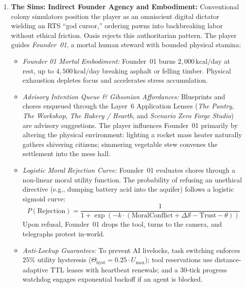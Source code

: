 \begin{enumerate}
    \item \textbf{The Sims: Indirect Founder Agency and Embodiment:} Conventional colony simulators position the player as an omniscient digital dictator wielding an RTS ``god cursor,'' ordering pawns into backbreaking labor without ethical friction. Oasis rejects this authoritarian pattern. The player guides \textit{Founder~01}, a mortal human steward with bounded physical stamina:
    \begin{itemize}
        \item \textit{Founder 01 Mortal Embodiment:} Founder~01 burns $2{,}000\,\mathrm{kcal/day}$ at rest, up to $4{,}500\,\mathrm{kcal/day}$ breaking asphalt or felling timber. Physical exhaustion depletes focus and accelerates stress accumulation.
        \item \textit{Advisory Intention Queue \& Gibsonian Affordances:} Blueprints and chores enqueued through the Layer~6 Application Lenses (\textit{The Pantry}, \textit{The Workshop}, \textit{The Bakery / Hearth}, and \textit{Scenario Zero Forge Studio}) are advisory suggestions. The player influences Founder~01 primarily by altering the physical environment: lighting a rocket mass heater naturally gathers shivering citizens; simmering vegetable stew convenes the settlement into the mess hall.
        \item \textit{Logistic Moral Rejection Curve:} Founder~01 evaluates chores through a non-linear moral utility function. The probability of refusing an unethical directive (e.g., dumping battery acid into the aquifer) follows a logistic sigmoid curve:
        \begin{equation}
            P(\mathrm{Rejection}) = \frac{1}{1 + \exp\left(-k \cdot (\mathrm{MoralConflict} + \Delta\mathcal{S} - \mathrm{Trust} - \theta)\right)}
        \end{equation}
        Upon refusal, Founder~01 drops the tool, turns to the camera, and telegraphs protest in-world.
        \item \textit{Anti-Lockup Guarantees:} To prevent AI livelocks, task switching enforces $25\%$ utility hysteresis ($\Theta_{\mathrm{hyst}} = 0.25 \cdot U_{\max}$); tool reservations use distance-adaptive TTL leases with heartbeat renewals; and a 30-tick progress watchdog engages exponential backoff if an agent is blocked.
    \end{itemize}


\end{enumerate}
